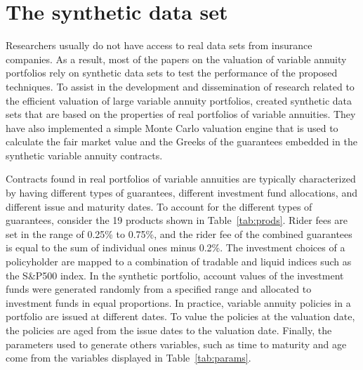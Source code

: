\chapter{The synthetic data set}\label{chap:dataset}

Researchers usually do not have access to real data sets from insurance companies. As a result, most of the papers on the valuation of variable annuity portfolios rely on synthetic data sets to test the performance of the proposed techniques. To assist in the development and dissemination of research related to the efficient valuation of large variable annuity portfolios, \cite{gan2017modeling} created synthetic data sets that are based on the properties of real portfolios of variable annuities. They have also implemented a simple Monte Carlo valuation engine that is used to calculate the fair market value and the Greeks of the guarantees embedded in the synthetic variable annuity contracts.

Contracts found in real portfolios of variable annuities are typically characterized by having different types of guarantees, different investment fund allocations, and different issue and maturity dates.
%
To account for the different types of guarantees, %
\cite{gan2017modeling} consider the 19 products shown in Table~\ref{tab:prods}. 
Rider fees are set in the range of 0.25\% to 0.75\%, and the rider fee of the combined guarantees is equal to the sum of individual ones minus 0.2\%.
%
The investment choices of a policyholder are mapped to a combination of tradable and liquid indices such as the S\&P500 index. In the synthetic portfolio, account values of the investment funds were generated randomly from a specified range and allocated to investment funds in equal proportions. 
%
In practice, variable annuity policies in a portfolio are issued at different dates. To value the policies at the valuation date, the policies are aged from the issue dates to the valuation date. Finally, the parameters used to generate others variables, such as time to maturity and age come from the variables displayed in Table~\ref{tab:params}.

